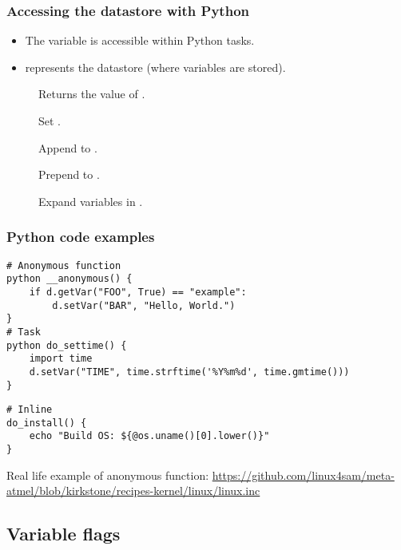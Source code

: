 \begin{frame}
  \frametitle{Accessing the datastore with Python}
  \begin{itemize}
    \item The  variable is accessible within Python tasks.
    \item {} represents the  datastore (where variables are
      stored).
  \end{itemize}
  \begin{description}
    \item[] Returns the value of
      .
    \item[] Set .
    \item[] Append  to
      .
    \item[] Prepend  to
      .
    \item[] Expand variables in
      .
  \end{description}
\end{frame}

\begin{frame}[fragile]
  \frametitle{Python code examples}
  \small
  \begin{verbatim}
# Anonymous function
python __anonymous() {
    if d.getVar("FOO", True) == "example":
        d.setVar("BAR", "Hello, World.")
}
# Task
python do_settime() {
    import time
    d.setVar("TIME", time.strftime('%Y%m%d', time.gmtime()))
}
  \end{verbatim}
  \begin{verbatim}
# Inline
do_install() {
    echo "Build OS: ${@os.uname()[0].lower()}"
}
  \end{verbatim}
Real life example of anonymous function:
\footnotesize
\url{https://github.com/linux4sam/meta-atmel/blob/kirkstone/recipes-kernel/linux/linux.inc}
\end{frame}

\subsection{Variable flags}

